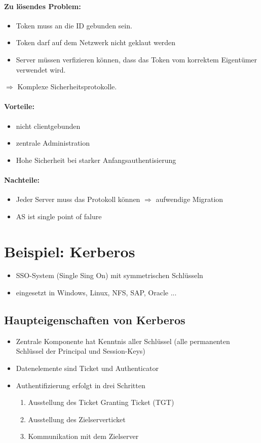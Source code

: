 \paragraph{Zu lösendes Problem:}
\begin{itemize}
	\item Token muss an die ID gebunden sein.
	\item Token darf auf dem Netzwerk nicht geklaut werden
	\item Server müssen verfizieren können, dass das Token vom korrektem Eigentümer verwendet wird.
\end{itemize}
$\Rightarrow$ Komplexe Sicherheitsprotokolle.
\paragraph{Vorteile:}
\begin{itemize}
	\item nicht clientgebunden
	\item zentrale Administration
	\item Hohe Sicherheit bei starker Anfangsauthentisierung
\end{itemize}

\paragraph{Nachteile:}
 \begin{itemize}
	\item Jeder Server muss das Protokoll können $\Rightarrow$ aufwendige Migration
	\item AS ist single point of falure
\end{itemize}

\section{Beispiel: Kerberos}
\begin{itemize}
	\item SSO-System (Single Sing On) mit symmetrischen Schlüsseln
	\item eingesetzt in Windows, Linux, NFS, SAP, Oracle ...
\end{itemize}

\subsection{Haupteigenschaften von Kerberos}
\begin{itemize}
	\item Zentrale Komponente hat Kenntnis aller Schlüssel (alle permanenten Schlüssel der Principal und Session-Keys)
	\item Datenelemente sind Ticket und Authenticator
	\item Authentifizierung erfolgt in drei Schritten
	\begin{enumerate}
		\item Ausstellung des Ticket Granting Ticket (TGT)
		\item Ausstellung des Zielserverticket
		\item Kommunikation mit dem Zielserver
	\end{enumerate}
\end{itemize}

